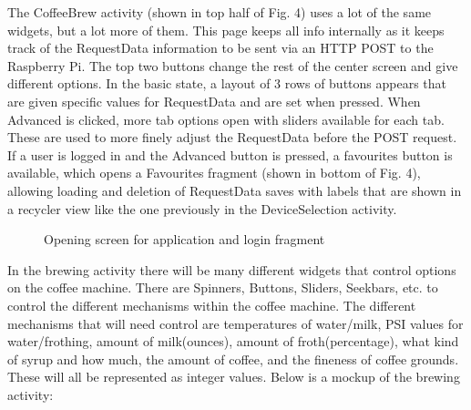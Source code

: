 \documentclass[conference]{IEEEtran}
\begin{document}
The CoffeeBrew activity (shown in top half of Fig. 4) uses
a lot of the same widgets, but a lot more of them. This page
keeps all info internally as it keeps track of the RequestData
information to be sent via an HTTP POST to the Raspberry Pi. The
top two buttons change the rest of the center screen and give
different options. In the basic state, a layout of 3 rows of
buttons appears that are given specific values for RequestData
and are set when pressed. When Advanced is clicked, more
tab options open with sliders available for each tab. These
are used to more finely adjust the RequestData before the
POST request. If a user is logged in and the Advanced button
is pressed, a favourites button is available, which opens a
Favourites fragment (shown in bottom of Fig. 4), allowing
loading and deletion of RequestData saves with labels that
are shown in a recycler view like the one previously in the
DeviceSelection activity.


\begin{figure}
    \begin{subfigure}
        \texttt{[image: mainmenu]}
    \end{subfigure}
\hspace{5mm}
    \begin{subfigure}
    \end{subfigure}
\caption{Opening screen for application and login fragment}
\end{figure}

In the brewing activity there will be many different widgets that control options
on the coffee machine. There are Spinners, Buttons, Sliders, Seekbars, etc. to control
the different mechanisms within the coffee machine. The different
mechanisms that will need control are temperatures of water/milk, PSI values for water/frothing,
amount of milk(ounces), amount of froth(percentage), what kind of syrup and how much, the amount of coffee, and the fineness
of coffee grounds. These will all be represented as integer values. Below is a mockup of the brewing activity:
\end{document}
